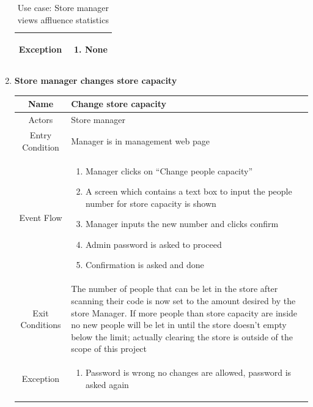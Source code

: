 \begin{enumerate}
\begin{table}[H]
{\begin{tabular}{|c|p{14cm}|}
			Exception & \begin{enumerate}
				\item None
				
			\end{enumerate}\\
			
			\hline
		\end{tabular}
	}
	\label{tab:UCStatistic}
	\caption{Use case: Store manager views affluence statistics}
\end{table}

\item \textbf{Store manager changes store capacity}

\begin{table}[H]
	{
		\begin{tabular}{|c|p{14cm}|}
			\hline
			Name & Change store capacity\\
			\hline
			Actors & Store manager\\
			\hline
			Entry Condition & Manager is in management web page\\
			\hline
			
			Event Flow & \begin{enumerate}
				\item Manager clicks on “Change people capacity”
				\item A screen which contains a text box to input the people number for store capacity is shown
				\item Manager inputs the new number and clicks confirm
				\item Admin password is asked to proceed
				\item Confirmation is asked and done
				
			\end{enumerate}\\
			
			\hline
			Exit Conditions & The number of people that can be let in the store after scanning their code is now set to the amount desired by the store Manager.
			If more people than store capacity are inside no new people will be let in until the store doesn’t empty below the limit; actually clearing the store is outside of the scope of this project\\
			\hline
			
			Exception & \begin{enumerate}
				\item Password is wrong\newline
				no changes are allowed, password is asked again
		

\end{enumerate}
\end{tabular}}
\end{table}
\end{enumerate}
